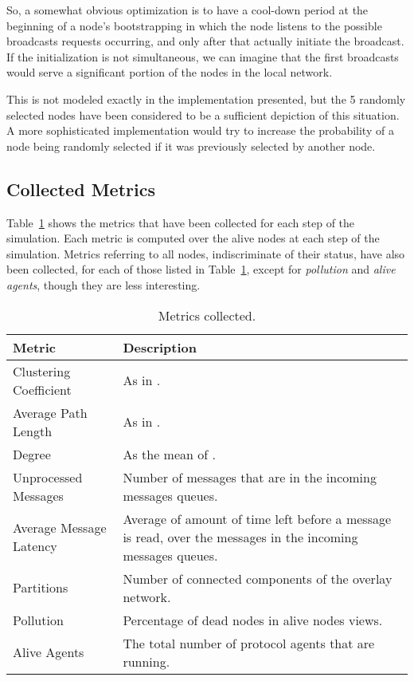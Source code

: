\documentclass[a4paper]{ifacconf}
\begin{document}
So, a somewhat obvious optimization is to have a cool-down period at the beginning of a node's bootstrapping in which the node listens to the possible broadcasts requests occurring, and only after that actually initiate the broadcast.
If the initialization is not simultaneous, we can imagine that the first broadcasts would serve a significant portion of the nodes in the local network.

This is not modeled exactly in the implementation presented, but the 5 randomly selected nodes have been considered to be a sufficient depiction of this situation.
A more sophisticated implementation would try to increase the probability of a node being randomly selected if it was previously selected by another node.

\subsection{Collected Metrics}\label{sec:metrics}

Table~\ref{tab:metrics} shows the metrics that have been collected for each step of the simulation.
Each metric is computed over the alive nodes at each step of the simulation.
Metrics referring to all nodes, indiscriminate of their status, have also been collected, for each of those listed in Table~\ref{tab:metrics}, except for \emph{pollution} and \emph{alive agents}, though they are less interesting.

\begin{table}
    \centering\begin{tabular}{lp{.5\linewidth}}
        Metric & Description \\
        \hline
        Clustering Coefficient & As in \cite[p. 11]{slides}. \\
        Average Path Length & As in \cite[p. 13]{slides}. \\
        Degree & As the mean of \cite[p. 15]{slides}. \\
        Unprocessed Messages & Number of messages that are in the incoming messages queues. \\
        Average Message Latency & Average of amount of time left before a message is read, over the messages in the incoming messages queues. \\
        Partitions & Number of connected components of the overlay network. \\
        Pollution & Percentage of dead nodes in alive nodes views. \\
        Alive Agents & The total number of protocol agents that are running. \\
    \end{tabular}
    \caption{Metrics collected.}
    \label{tab:metrics}
\end{table}
\end{document}
